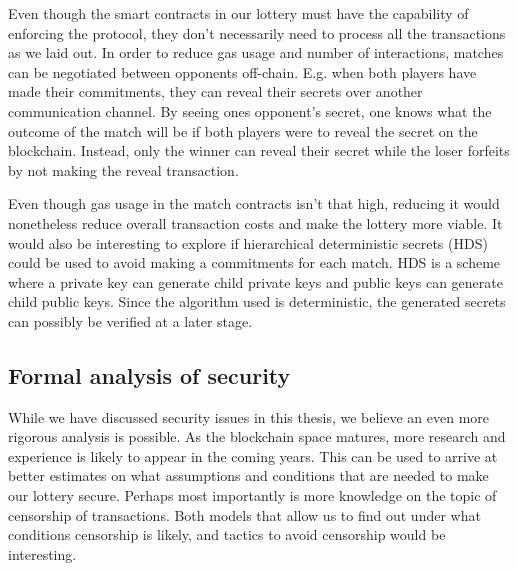 Even though the smart contracts in our lottery must have the capability of enforcing the protocol, they don't necessarily need to process all the transactions as we laid out. In order to reduce gas usage and number of interactions, matches can be negotiated between opponents off-chain. E.g. when both players have made their commitments, they can reveal their secrets over another communication channel. By seeing ones opponent's secret, one knows what the outcome of the match will be if both players were to reveal the secret on the blockchain. Instead, only the winner can reveal their secret while the loser forfeits by not making the reveal transaction.

Even though gas usage in the match contracts isn't that high, reducing it would nonetheless reduce overall transaction costs and make the lottery more viable. It would also be interesting to explore if hierarchical deterministic secrets (HDS) could be used to avoid making a commitments for each match. HDS is a scheme where a private key can generate child private keys and public keys can generate child public keys. Since the algorithm used is deterministic, the generated secrets can possibly be verified at a later stage.

\subsection{Formal analysis of security}

While we have discussed security issues in this thesis, we believe an even more rigorous analysis is possible. As the blockchain space matures, more research and experience is likely to appear in the coming years. This can be used to arrive at better estimates on what assumptions and conditions that are needed to make our lottery secure. Perhaps most importantly is more knowledge on the topic of censorship of transactions. Both models that allow us to find out under what conditions censorship is likely, and tactics to avoid censorship would be interesting.
